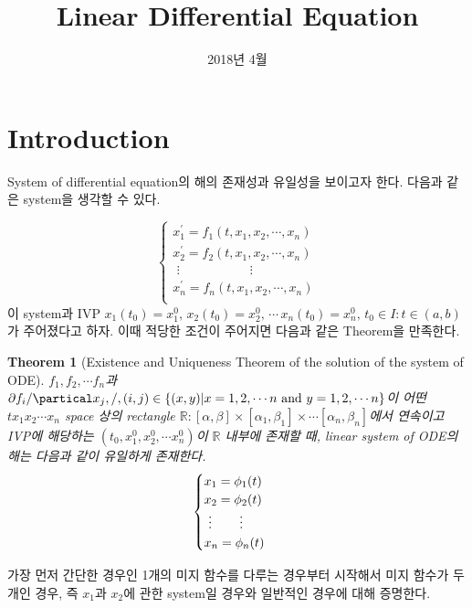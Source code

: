 \documentclass[a4paper,10pt]{article}
\date{2018년 4월}
\title{Linear Differential Equation}
\newtheorem{theorem}{Theorem}[section]
\begin{document}
\maketitle
\section{Introduction}
System of differential equation의 해의 존재성과 유일성을 보이고자 한다. 다음과 같은 system을 생각할 수 있다.

\begin{equation}
    \begin{cases}
    x_1^{\prime} = f_1(t, x_1, x_2, \cdots, x_n) \\
    x_2^{\prime} = f_2(t, x_1, x_2, \cdots, x_n) \\
    \,\, \vdots \qquad\qquad\quad\, \, \, \vdots \\
    x_n^{\prime} = f_n(t, x_1, x_2, \cdots, x_n) \\
    \end{cases}
\end{equation}
이 system과 IVP $x_1(t_0) = x_1^0, \, x_2(t_0) = x_2^0, \, \cdots \, x_n(t_0) = x_n^0,\, t_0 \in I: t \in (a, b)$가 주어졌다고 하자. 이때 적당한 조건이 주어지면 다음과 같은 Theorem을 만족한다.\newline
\begin{theorem}[Existence and Uniqueness Theorem of the solution of the system of ODE]
\label{ode}
$f_1, f_2, \cdots f_n$과 $\partial f_i/\partical x_j, /, (i,j) \in \{(x,y) | x = 1, 2, \cdots n \ \text{and} \ y = 1, 2, \cdots n\}$이 어떤 $tx_1x_2\cdots x_n$ space 상의 rectangle $\mathbb{R}: [ \alpha, \beta ] \times [ \alpha_1, \beta_1 ] \times \cdots [ \alpha_n, \beta_n ]$에서 연속이고 IVP에 해당하는 $(t_0, x_1^0, x_2^0, \cdots x_n^0 )$이 $\mathbb{R}$ 내부에 존재할 때, linear system of ODE의 해는 다음과 같이 유일하게 존재한다.
\begin{equation}
    \begin{cases}
    x_1 = \phi_1(t) \\
    x_2 = \phi_2(t) \\
    \,\, \vdots \qquad \, \vdots\\
    x_n = \phi_n(t) \\
    \end{cases}
    \newline
\end{equation}
\end{theorem}
가장 먼저 간단한 경우인 1개의 미지 함수를 다루는 경우부터 시작해서 미지 함수가 두 개인 경우, 즉 $x_1$과 $x_2$에 관한 system일 경우와 일반적인 경우에 대해 증명한다.
\end{document}
